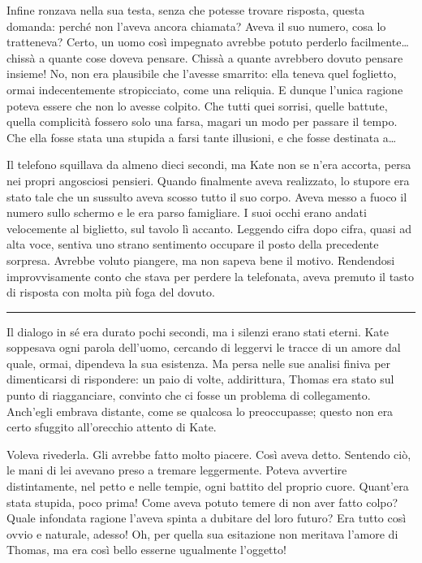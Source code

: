 \documentclass[a4paper,oneside,11pt]{memoir}
\begin{document}
Infine ronzava nella sua testa, senza che potesse trovare risposta, questa
domanda: perché non l'aveva ancora chiamata? Aveva il suo numero, cosa lo
tratteneva? Certo, un uomo così impegnato avrebbe potuto perderlo
facilmente\dots{} chissà a quante cose doveva pensare. Chissà a quante avrebbero
dovuto pensare insieme! No, non era plausibile che l'avesse smarrito: ella
teneva quel foglietto, ormai indecentemente stropicciato, come una reliquia. E
dunque l'unica ragione poteva essere che non lo avesse colpito. Che tutti quei
sorrisi, quelle battute, quella complicità fossero solo una farsa, magari un
modo per passare il tempo. Che ella fosse stata una stupida a farsi tante
illusioni, e che fosse destinata a\dots{}

Il telefono squillava da almeno dieci secondi, ma Kate non se n'era accorta,
persa nei propri angosciosi pensieri. Quando finalmente aveva realizzato, lo
stupore era stato tale che un sussulto aveva scosso tutto il suo corpo. Aveva
messo a fuoco il numero sullo schermo e le era parso famigliare. I suoi occhi
erano andati velocemente al biglietto, sul tavolo lì accanto. Leggendo cifra
dopo cifra, quasi ad alta voce, sentiva uno strano sentimento occupare il posto
della precedente sorpresa. Avrebbe voluto piangere, ma non sapeva bene il
motivo. Rendendosi improvvisamente conto che stava per perdere la telefonata,
aveva premuto il tasto di risposta con molta più foga del dovuto.

\plainbreak{1}

Il dialogo in sé era durato pochi secondi, ma i silenzi erano stati eterni. Kate
soppesava ogni parola dell'uomo, cercando di leggervi le tracce di un amore dal
quale, ormai, dipendeva la sua esistenza. Ma persa nelle sue analisi finiva per
dimenticarsi di rispondere: un paio di volte, addirittura, Thomas era stato sul
punto di riagganciare, convinto che ci fosse un problema di collegamento.
Anch'egli embrava distante, come se qualcosa lo preoccupasse; questo non era
certo sfuggito all'orecchio attento di Kate.

Voleva rivederla. Gli avrebbe fatto molto piacere. Così aveva detto. Sentendo
ciò, le mani di lei avevano preso a tremare leggermente. Poteva avvertire
distintamente, nel petto e nelle tempie, ogni battito del proprio cuore.
Quant'era stata stupida, poco prima! Come aveva potuto temere di non aver fatto
colpo? Quale infondata ragione l'aveva spinta a dubitare del loro futuro? Era
tutto così ovvio e naturale, adesso! Oh, per quella sua esitazione non meritava
l'amore di Thomas, ma era così bello esserne ugualmente l'oggetto!
\end{document}
